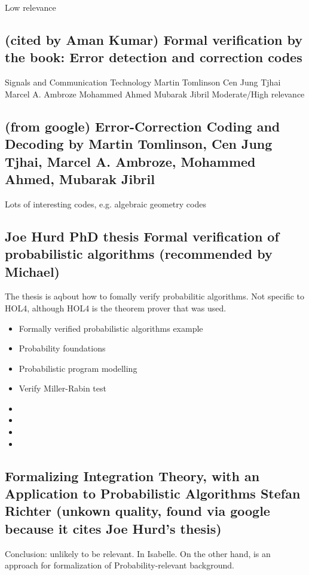 \documentclass{article}
\begin{document}
Low relevance


\subsection{(cited by Aman Kumar) Formal verification by the book: Error detection and correction codes}
Signals and Communication Technology
Martin Tomlinson
Cen Jung Tjhai
Marcel A. Ambroze
Mohammed Ahmed
Mubarak Jibril
Moderate/High relevance

\subsection {(from google) Error-Correction Coding and Decoding by Martin Tomlinson, Cen Jung Tjhai, Marcel A. Ambroze, Mohammed Ahmed, Mubarak Jibril}

Lots of interesting codes, e.g. algebraic geometry codes

\subsection {Joe Hurd PhD thesis Formal verification of probabilistic
algorithms (recommended by Michael)}

The thesis is aqbout how to fomally verify probabilitic algorithms. Not specific to HOL4, although HOL4 is the theorem prover that was used.

\begin{itemize}
\item {Formally verified probabilistic algorithms example}
\item {Probability foundations}
\item {Probabilistic program modelling}
\item {Verify Miller-Rabin test}
\item {}
\item {}
\item {}
\item {}
\end{itemize}


\subsection{Formalizing Integration Theory, with an
Application to Probabilistic Algorithms
Stefan Richter 
(unkown quality, found via google because it cites Joe Hurd's thesis)}

Conclusion: unlikely to be relevant. In Isabelle. On the other hand, is an approach for formalization of Probability-relevant background.
\end{document}
